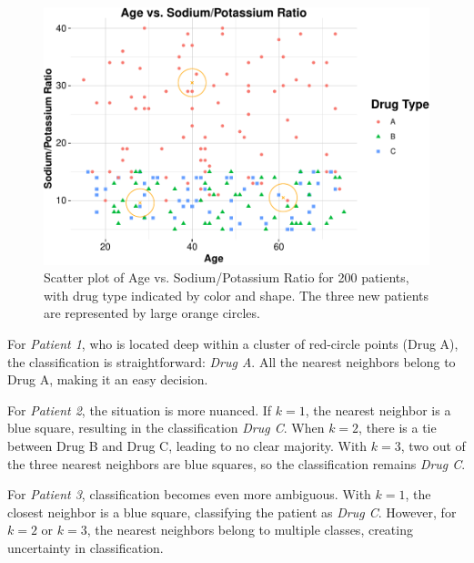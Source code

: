 \documentclass[
]{book}
\theoremstyle{definition}
\theoremstyle{definition}
\theoremstyle{definition}
\theoremstyle{definition}
\theoremstyle{remark}
\begin{document}
\begin{figure}

{\centering \includegraphics[width=0.95\linewidth]{knn_files/figure-latex/scatter-plot-ex-drug-2-1} 

}

\caption{Scatter plot of Age vs. Sodium/Potassium Ratio for 200 patients, with drug type indicated by color and shape. The three new patients are represented by large orange circles.}\label{fig:scatter-plot-ex-drug-2}
\end{figure}

For \emph{Patient 1}, who is located deep within a cluster of red-circle points (Drug A), the classification is straightforward: \emph{Drug A}. All the nearest neighbors belong to Drug A, making it an easy decision.

For \emph{Patient 2}, the situation is more nuanced. If \(k = 1\), the nearest neighbor is a blue square, resulting in the classification \emph{Drug C}. When \(k = 2\), there is a tie between Drug B and Drug C, leading to no clear majority. With \(k = 3\), two out of the three nearest neighbors are blue squares, so the classification remains \emph{Drug C}.

For \emph{Patient 3}, classification becomes even more ambiguous. With \(k = 1\), the closest neighbor is a blue square, classifying the patient as \emph{Drug C}. However, for \(k = 2\) or \(k = 3\), the nearest neighbors belong to multiple classes, creating uncertainty in classification.
\end{document}
